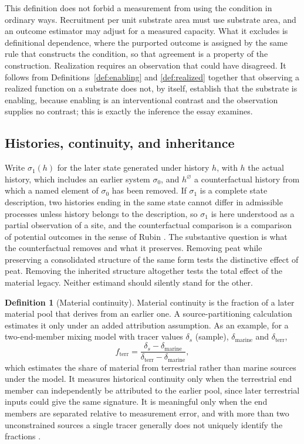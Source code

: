 \documentclass[11pt]{article}
\theoremstyle{definition}
\newtheorem{definition}{Definition}
\theoremstyle{remark}
\begin{document}
This definition does not forbid a measurement from using the condition in ordinary ways. Recruitment per unit substrate area must use substrate area, and an outcome estimator may adjust for a measured capacity. What it excludes is definitional dependence, where the purported outcome is assigned by the same rule that constructs the condition, so that agreement is a property of the construction. Realization requires an observation that could have disagreed. It follows from Definitions~\ref{def:enabling} and \ref{def:realized} together that observing a realized function on a substrate does not, by itself, establish that the substrate is enabling, because enabling is an interventional contrast and the observation supplies no contrast; this is exactly the inference the essay examines.

\subsection{Histories, continuity, and inheritance}

Write $\sigma_1(h)$ for the later state generated under history $h$, with $h$ the actual history, which includes an earlier system $\sigma_0$, and $h^{\varnothing}$ a counterfactual history from which a named element of $\sigma_0$ has been removed. If $\sigma_1$ is a complete state description, two histories ending in the same state cannot differ in admissible processes unless history belongs to the description, so $\sigma_1$ is here understood as a partial observation of a site, and the counterfactual comparison is a comparison of potential outcomes in the sense of Rubin \cite{rubin1974}. The substantive question is what the counterfactual removes and what it preserves. Removing peat while preserving a consolidated structure of the same form tests the distinctive effect of peat. Removing the inherited structure altogether tests the total effect of the material legacy. Neither estimand should silently stand for the other.

\begin{definition}[Material continuity]\label{def:material}
Material continuity is the fraction of a later material pool that derives from an earlier one. A source-partitioning calculation estimates it only under an added attribution assumption. As an example, for a two-end-member mixing model with tracer values $\delta_s$ (sample), $\delta_{\mathrm{marine}}$ and $\delta_{\mathrm{terr}}$,
\[
f_{\mathrm{terr}}=\frac{\delta_s-\delta_{\mathrm{marine}}}{\delta_{\mathrm{terr}}-\delta_{\mathrm{marine}}},
\]
which estimates the share of material from terrestrial rather than marine sources under the model. It measures historical continuity only when the terrestrial end member can independently be attributed to the earlier pool, since later terrestrial inputs could give the same signature. It is meaningful only when the end members are separated relative to measurement error, and with more than two unconstrained sources a single tracer generally does not uniquely identify the fractions \cite{parnell2010}.
\end{definition}
\end{document}
